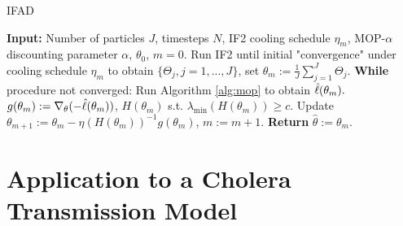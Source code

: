 \documentclass[9pt,twocolumn,pnasresearcharticle]{pnas-new}
\newcommand\arxiv[2]{#2} %
\begin{document}
\begin{algorithm}[H]
	\caption{IFAD}
    \label{alg:ifad}
	    \textbf{Input:} Number of particles $J$, timesteps $N$, IF2 cooling schedule $\eta_m$, MOP-$\alpha$ discounting parameter $\alpha$, $\theta_0$, $m=0.$\newline
        Run IF2 until initial "convergence" under cooling schedule $\eta_m$ to obtain $\{\Theta_j, j=1,...,J\}$, set $\theta_m := \frac{1}{J}\sum_{j=1}^J \Theta_j.$\newline
		\textbf{While} procedure not converged: \newline
		\hspace*{4mm} Run Algorithm \ref{alg:mop} to obtain $\hat{\ell}(\theta_m).$ \newline
		\hspace*{4mm} $g(\theta_m) := \nabla_{\theta}(-\hat{\ell}(\theta_m))$, $H(\theta_m)$ s.t. $\lambda_{\min}(H(\theta_m)) \geq c$. \newline
		\hspace*{4mm} Update $\theta_{m+1} := \theta_m - \eta (H(\theta_m))^{-1} g(\theta_m)$, $m:=m+1.$ \newline
		\textbf{Return} $\hat{\theta} := \theta_m.$
\end{algorithm}

\arxiv{}{\vspace*{-2mm}}
\section{Application to a Cholera Transmission Model}
\label{sec:cholera}
\end{document}

